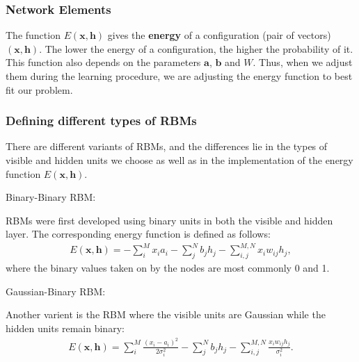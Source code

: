 \documentclass{beamer}
\begin{document}
\begin{frame}
\frametitle{Network Elements}

The function $E(\mathbf{x},\mathbf{h})$ gives the \textbf{energy} of a
configuration (pair of vectors) $(\mathbf{x}, \mathbf{h})$. The lower
the energy of a configuration, the higher the probability of it. This
function also depends on the parameters $\mathbf{a}$, $\mathbf{b}$ and
$W$. Thus, when we adjust them during the learning procedure, we are
adjusting the energy function to best fit our problem.
\end{frame}

\begin{frame}
\frametitle{Defining different types of RBMs}

There are different variants of RBMs, and the differences lie in the types of visible and hidden units we choose as well as in the implementation of the energy function $E(\mathbf{x},\mathbf{h})$. 

\begin{block}{Binary-Binary RBM: }

RBMs were first developed using binary units in both the visible and hidden layer. The corresponding energy function is defined as follows:
\begin{align}
	E(\mathbf{x}, \mathbf{h}) = - \sum_i^M x_i a_i- \sum_j^N b_j h_j - \sum_{i,j}^{M,N} x_i w_{ij} h_j,
\end{align}
where the binary values taken on by the nodes are most commonly 0 and 1.
\end{block}
\begin{block}{Gaussian-Binary RBM: }

Another varient is the RBM where the visible units are Gaussian while the hidden units remain binary:
\begin{align}
	E(\mathbf{x}, \mathbf{h}) = \sum_i^M \frac{(x_i - a_i)^2}{2\sigma_i^2} - \sum_j^N b_j h_j - \sum_{i,j}^{M,N} \frac{x_i w_{ij} h_j}{\sigma_i^2}. 
\end{align}
\end{block}
\end{frame}
\end{document}
